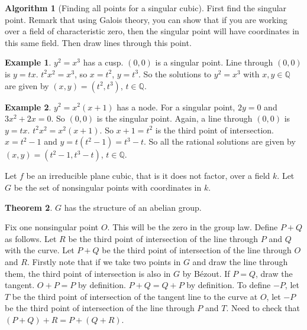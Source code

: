 \documentclass{article}
\newcommand{\Q}{\mathbb{Q}}
\newcommand{\rb}[1]{\left( #1 \right)}
\theoremstyle{definition}\newtheorem{definition}{Definition}[section]
\theoremstyle{definition}\newtheorem{remark}[definition]{Remark}
\theoremstyle{definition}\newtheorem*{example}{Example}
\theoremstyle{definition}\newtheorem*{note}{Note}
\newtheorem{theorem}[definition]{Theorem}
\newtheorem{algorithm}[definition]{Algorithm}
\begin{document}
\begin{algorithm}[Finding all points for a singular cubic]
First find the singular point. Remark that using Galois theory, you can show that if you are working over a field of characteristic zero, then the singular point will have coordinates in this same field. Then draw lines through this point.
\end{algorithm}


\begin{example}
$ y^2 = x^3 $ has a cusp. $ \rb{0, 0} $ is a singular point. Line through $ \rb{0, 0} $ is $ y = tx $. $ t^2x^2 = x^3 $, so $ x = t^2 $, $ y = t^3 $. So the solutions to $ y^2 = x^3 $ with $ x, y \in \Q $ are given by $ \rb{x, y} = \rb{t^2, t^3} $, $ t \in \Q $.
\end{example}

\begin{example}
$ y^2 = x^2\rb{x + 1} $ has a node. For a singular point, $ 2y = 0 $ and $ 3x^2 + 2x = 0 $. So $ \rb{0, 0} $ is the singular point. Again, a line through $ \rb{0, 0} $ is $ y = tx $. $ t^2x^2 = x^2\rb{x + 1} $. So $ x + 1 = t^2 $ is the third point of intersection. $ x = t^2 - 1 $ and $ y = t\rb{t^2 - 1} = t^3 - t $. So all the rational solutions are given by $ \rb{x, y} = \rb{t^2 - 1, t^3 - t} $, $ t \in \Q $.
\end{example}

Let $ f $ be an irreducible plane cubic, that is it does not factor, over a field $ k $. Let $ G $ be the set of nonsingular points with coordinates in $ k $.

\begin{theorem}
$ G $ has the structure of an abelian group.
\end{theorem}

Fix one nonsingular point $ O $. This will be the zero in the group law. Define $ P + Q $ as follows. Let $ R $ be the third point of intersection of the line through $ P $ and $ Q $ with the curve. Let $ P + Q $ be the third point of intersection of the line through $ O $ and $ R $. Firstly note that if we take two points in $ G $ and draw the line through them, the third point of intersection is also in $ G $ by Bézout. If $ P = Q $, draw the tangent. $ O + P = P $ by definition. $ P + Q = Q + P $ by definition. To define $ -P $, let $ T $ be the third point of intersection of the tangent line to the curve at $ O $, let $ -P $ be the third point of intersection of the line through $ P $ and $ T $. Need to check that $ \rb{P + Q} + R = P + \rb{Q + R} $.
\end{document}
